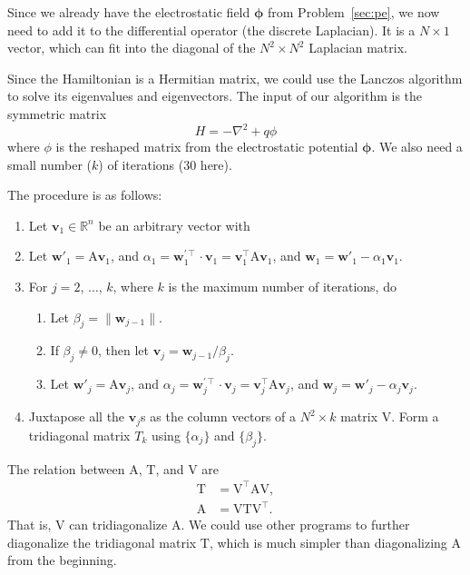 \Answer{}
Since we already have the electrostatic field \(\bm{\phi}\) from Problem~\ref{sec:pe},
we now need to add it to the differential operator (the discrete Laplacian).
It is a \(N \times 1\) vector, which can fit into the diagonal of the
\(N^2 \times N^2\) Laplacian matrix.

Since the Hamiltonian is a Hermitian matrix, we could use the Lanczos algorithm to
solve its eigenvalues and eigenvectors.
The input of our algorithm is the symmetric matrix
%
\begin{equation}\label{eq:hamiltonian}
    H = -\nabla^2 + q \phi
\end{equation}
%
where \(\phi\) is the reshaped matrix from the electrostatic potential \(\bm{\phi}\).
We also need a small number ($k$) of iterations (\(30\) here).

The procedure is as follows:
%
\begin{enumerate}
                       Euclidean norm $1$.
    \item\label{it:v1} Let $\bm{v}_1 \in \mathbb{ R }^n$ be an arbitrary vector with
    \item Let $\bm{w}'_1 = \mathrm{A} \bm{v}_1$, and
          $\alpha_1 = \bm{w}^{\prime\intercal}_1 \cdot \bm{v}_1 = \bm{v}_1^\intercal \mathrm{A} \bm{v}_1$,
          and $\bm{w}_1 = \bm{w}'_1 - \alpha_1 \bm{v}_1$.
    \item For $j = 2$, $\ldots$, $k$, where $k$ is the maximum number of iterations, do
          \begin{enumerate}
              \item Let $\beta_j = \| \bm{w}_{j-1} \|$.
              \item If $\beta_j \neq 0$, then let $\bm{v}_j = \bm{w}_{j-1} / \beta_j$.
              \item Let $\bm{w}'_j = \mathrm{A} \bm{v}_j$, and
                    $\alpha_j = \bm{w}^{\prime\intercal}_j \cdot \bm{v}_j = \bm{v}_j^\intercal \mathrm{A} \bm{v}_j$,
                    and $\bm{w}_j = \bm{w}'_j - \alpha_j \bm{v}_j$.
          \end{enumerate}
    \item Juxtapose all the $\bm{v}_j$s as the
          column vectors of a $N^2 \times k$ matrix $\mathrm{V}$.
          Form a tridiagonal matrix $T_k$ using $\{\alpha_j\}$ and $\{\beta_j\}$.
\end{enumerate}
%
The relation between $\mathrm{A}$, $\mathrm{T}$, and $\mathrm{V}$ are
%
\begin{align}
    \mathrm{T} & = \mathrm{V}^\intercal \mathrm{A} \mathrm{V}, \\
    \mathrm{A} & = \mathrm{V} \mathrm{T} \mathrm{V}^\intercal.
\end{align}
%
That is, $\mathrm{V}$ can tridiagonalize $\mathrm{A}$.
We could use other programs to further diagonalize the tridiagonal matrix $\mathrm{T}$,
which is much simpler than diagonalizing $\mathrm{A}$ from the beginning.

